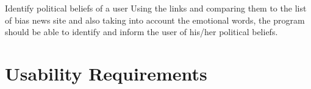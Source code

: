 \begin{requirement}{Identify political beliefs of a user }
Using the links and comparing them to the list of bias news site and also taking
into account the emotional words, the program should be able to identify and
inform the user of his/her political beliefs. 
\end{requirement}


\section{Usability Requirements}
